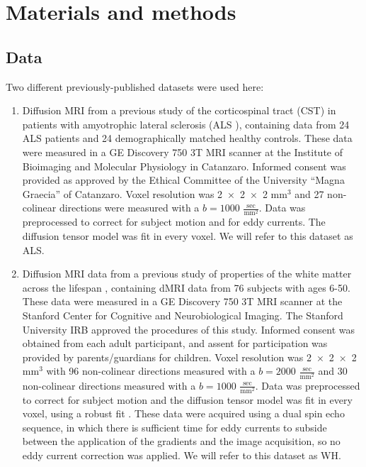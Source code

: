 \section*{Materials and methods}

\subsection*{Data}

Two different previously-published datasets were used here:

\begin{enumerate}

\item Diffusion MRI from a previous study of the corticospinal
tract (CST) in patients with amyotrophic lateral sclerosis
(ALS \cite{sarica2017corticospinal}), containing data from 24 ALS
patients and 24 demographically matched healthy controls. These data
were measured in a GE Discovery 750 3T MRI scanner at the Institute
of Bioimaging and Molecular Physiology in Catanzaro. Informed consent
was provided as approved by the Ethical Committee of the University
``Magna Graecia'' of Catanzaro. Voxel resolution was \num{2x2x2}
$\text{mm}^3$ and 27 non-colinear directions were measured with a
$b=1000$ $\frac{\text{sec}}{\text{mm}^2}$. Data was preprocessed to 
correct for subject motion and for eddy currents. The diffusion tensor
model \cite{basser1994mr} was fit in every voxel.
We will refer to this dataset as ALS.

\item Diffusion MRI data from a previous study of properties of
the white matter across the lifespan \cite{yeatman2014lifespan},
containing dMRI data from 76 subjects with ages 6-50. These data were
measured in a GE Discovery 750 3T MRI scanner at the Stanford Center
for Cognitive and Neurobiological Imaging. The Stanford University
IRB approved the procedures of this study. Informed consent was
obtained from each adult participant, and assent for participation
was provided by parents/guardians for children. Voxel resolution was
\num{2x2x2}$\text{mm}^3$ with 96 non-colinear directions measured with a
$b=2000$ $\frac{\text{sec}}{\text{mm}^2}$ and 30 non-colinear directions
measured with a $b=1000$ $\frac{\text{sec}}{\text{mm}^2}$. Data was
preprocessed to correct for subject motion and the diffusion tensor
model \cite{basser1994mr} was fit in every voxel, using a robust fit
\cite{chang2005restore}. These data were acquired using a dual spin echo
sequence, in which there is sufficient time for eddy currents to subside
between the application of the gradients and the image acquisition, so
no eddy current correction was applied. We will refer to this dataset
as WH.

\end{enumerate}

